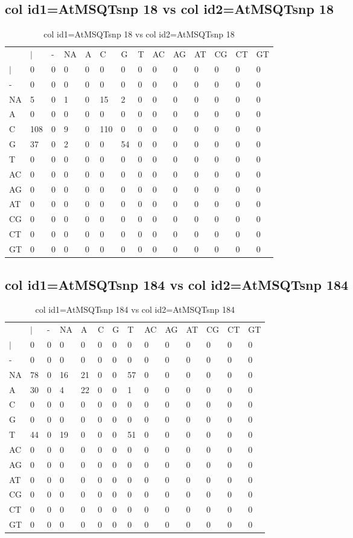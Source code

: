 \subsection{col id1=AtMSQTsnp 18 vs col id2=AtMSQTsnp 18}
\begin{center}
\begin{longtable}{|l|l|l|l|l|l|l|l|l|l|l|l|l|l|}
\caption{col id1=AtMSQTsnp 18 vs col id2=AtMSQTsnp 18} \label{table_dm752}\\
\hline
\\
\hline
&$|$&-&NA&A&C&G&T&AC&AG&AT&CG&CT&GT\\
$|$&0&0&0&0&0&0&0&0&0&0&0&0&0\\
-&0&0&0&0&0&0&0&0&0&0&0&0&0\\
NA&5&0&1&0&15&2&0&0&0&0&0&0&0\\
A&0&0&0&0&0&0&0&0&0&0&0&0&0\\
C&108&0&9&0&110&0&0&0&0&0&0&0&0\\
G&37&0&2&0&0&54&0&0&0&0&0&0&0\\
T&0&0&0&0&0&0&0&0&0&0&0&0&0\\
AC&0&0&0&0&0&0&0&0&0&0&0&0&0\\
AG&0&0&0&0&0&0&0&0&0&0&0&0&0\\
AT&0&0&0&0&0&0&0&0&0&0&0&0&0\\
CG&0&0&0&0&0&0&0&0&0&0&0&0&0\\
CT&0&0&0&0&0&0&0&0&0&0&0&0&0\\
GT&0&0&0&0&0&0&0&0&0&0&0&0&0\\
\hline
\end{longtable}
\end{center}

\subsection{col id1=AtMSQTsnp 184 vs col id2=AtMSQTsnp 184}
\begin{center}
\begin{longtable}{|l|l|l|l|l|l|l|l|l|l|l|l|l|l|}
\caption{col id1=AtMSQTsnp 184 vs col id2=AtMSQTsnp 184} \label{table_dm754}\\
\hline
\\
\hline
&$|$&-&NA&A&C&G&T&AC&AG&AT&CG&CT&GT\\
$|$&0&0&0&0&0&0&0&0&0&0&0&0&0\\
-&0&0&0&0&0&0&0&0&0&0&0&0&0\\
NA&78&0&16&21&0&0&57&0&0&0&0&0&0\\
A&30&0&4&22&0&0&1&0&0&0&0&0&0\\
C&0&0&0&0&0&0&0&0&0&0&0&0&0\\
G&0&0&0&0&0&0&0&0&0&0&0&0&0\\
T&44&0&19&0&0&0&51&0&0&0&0&0&0\\
AC&0&0&0&0&0&0&0&0&0&0&0&0&0\\
AG&0&0&0&0&0&0&0&0&0&0&0&0&0\\
AT&0&0&0&0&0&0&0&0&0&0&0&0&0\\
CG&0&0&0&0&0&0&0&0&0&0&0&0&0\\
CT&0&0&0&0&0&0&0&0&0&0&0&0&0\\
GT&0&0&0&0&0&0&0&0&0&0&0&0&0\\
\hline
\end{longtable}
\end{center}

